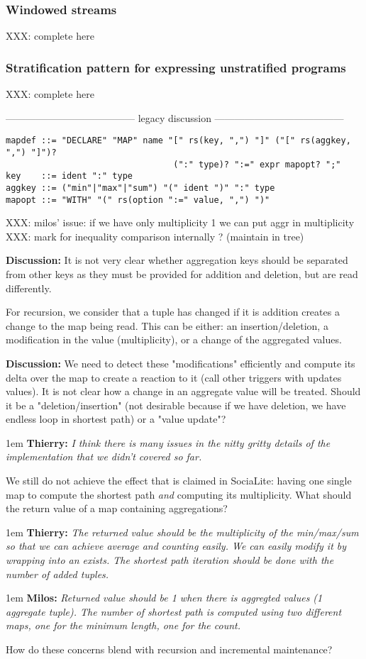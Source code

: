 \documentclass[11pt]{article}
\newlength{\dlen}
\def\discuss#1{\par\hspace{2em}
\setlength{\dlen}{\textwidth}
\addtolength{\dlen}{-2em}
\begin{minipage}{\dlen}\footnotesize {\bf\color{red} Discussion:} #1\end{minipage}\par}
\def\say#1#2{\begingroup\par\leftskip1em {\bf #1:} \it #2\par\endgroup}
\begin{document}
\subsubsection*{Windowed streams}
{\color{red} XXX: complete here}

\subsubsection*{Stratification pattern for expressing unstratified programs}
{\color{red} XXX: complete here}


{\center --------------------------------------- legacy discussion ---------------------------------------}
\begin{verbatim}
mapdef ::= "DECLARE" "MAP" name "[" rs(key, ",") "]" ("[" rs(aggkey, ",") "]")? 
                                 (":" type)? ":=" expr mapopt? ";" 
key    ::= ident ":" type
aggkey ::= ("min"|"max"|"sum") "(" ident ")" ":" type
mapopt ::= "WITH" "(" rs(option ":=" value, ",") ")"
\end{verbatim}

{\color{red}
XXX: milos' issue: if we have only multiplicity 1 we can put aggr in multiplicity\\
XXX: mark for inequality comparison internally ? (maintain in tree)
}

\discuss{It is not very clear whether aggregation keys should be separated from other keys as they must be provided for addition and deletion, but are read differently.}
For recursion, we consider that a tuple has changed if it is addition creates a change to the map being read. This can be either: an insertion/deletion, a modification in the value (multiplicity), or a change of the aggregated values.
\discuss{We need to detect these "modifications" efficiently and compute its delta over the map to create a reaction to it (call other triggers with updates values). It is not clear how a change in an aggregate value will be treated. Should it be a "deletion/insertion" (not desirable because if we have deletion, we have endless loop in shortest path) or a "value update"?
	\say{Thierry}{I think there is many issues in the nitty gritty details of the implementation that we didn't covered so far.}
We still do not achieve the effect that is claimed in SociaLite: having one single map to compute the shortest path \textit{and} computing its multiplicity. What should the return value of a map containing aggregations?
	\say{Thierry}{The returned value should be the multiplicity of the min/max/sum so that we can achieve average and counting easily. We can easily modify it by wrapping into an exists. The shortest path iteration should be done with the number of added tuples.}
	\say{Milos}{Returned value should be 1 when there is aggregted values (1 aggregate tuple). The number of shortest path is computed using two different maps, one for the minimum length, one for the count.}
}
How do these concerns blend with recursion and incremental maintenance?
\end{document}
